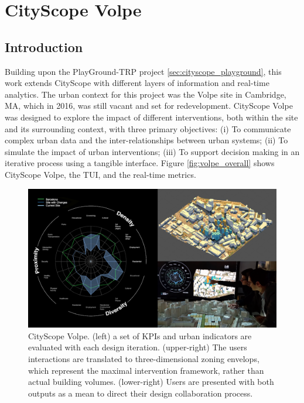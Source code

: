 \section{CityScope Volpe}\label{sec:cityscope_volpe}
{
    \subsection{Introduction}

    {
        Building upon the PlayGround-TRP project \eqref{sec:cityscope_playground}, this work extends CityScope with different layers of information and real-time analytics. The urban context for this project was the Volpe site in Cambridge, MA, which in 2016, was still vacant and set for redevelopment. CityScope Volpe was designed to explore the impact of different interventions, both within the site and its surrounding context, with three primary objectives: (i) To communicate complex urban data and the inter-relationships between urban systems; (ii) To simulate the impact of urban interventions; (iii) To support decision making in an iterative process using a tangible interface. Figure \eqref{fig:volpe_overall} shows CityScope Volpe, the TUI, and the real-time metrics.
    }

    \begin{figure}[!htb]
        \begin{center}
            \includegraphics[width=1\linewidth]{chapters/transformation/volpe/figures/volpe0.png}
        \end{center}
        \caption{CityScope Volpe. (left) a set of KPIs and urban indicators are evaluated with each design iteration. (upper-right) The users interactions are translated to three-dimensional zoning envelops, which represent the maximal intervention framework, rather than actual building volumes. (lower-right) Users are presented with both outputs as a mean to direct their design collaboration process.}
        \label{fig:volpe_overall}
    \end{figure}

}
